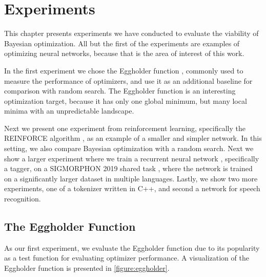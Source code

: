 \chapter{Experiments}
\label{chapter:experiments}

This chapter presents experiments we have conducted to evaluate the viability
of Bayesian optimization. All but the first of the experiments are examples of
optimizing neural networks, because that is the area of interest of this work.

In the first experiment we chose the Eggholder function \citep{eggholder},
commonly used to measure the performance of optimizers, and use it as an
additional baseline for comparison with random search. The Eggholder function
is an interesting optimization target, because it has only one global minimum,
but many local minima with an unpredictable landscape.

Next we present one experiment from reinforcement learning, specifically the
REINFORCE algorithm \citep{suttonbarto2018reinforcement}, as an example of a
smaller and simpler network. In this setting, we also compare Bayesian
optimization with a random search. Next we show a larger experiment where we
train a recurrent neural network \citep{dlbook}, specifically a tagger, on a
SIGMORPHON 2019 shared task \citep{sigmorphon2019task2}, where the network is
trained on a significantly larger dataset in multiple languages. Lastly, we
show two more experiments, one of a tokenizer written in C++, and second a
network for speech recognition.

\section{The Eggholder Function}

As our first experiment, we evaluate the Eggholder function \cite{eggholder}
due to its popularity as a test function for evaluating optimizer performance.
A visualization of the Eggholder function is presented in
\autoref{figure:eggholder}.

